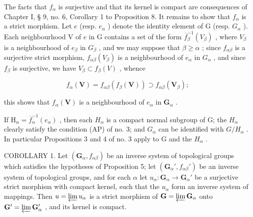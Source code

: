 The facts that \(f_{\alpha}\) is surjective and that its kernel is compact are consequences of Chapter I, § 9, no. 6, Corollary 1 to Proposition 8. It remains to show that \(f_{\alpha}\) is a strict morphism. Let \(e\) (resp. \(e_{\alpha}\) ) denote the identity element of G (resp. \(G_{\alpha}\) ). Each neighbourhood V of \(e\) in G contains a set of the form \(\overline{f}_{\beta}^{-1}(V_{\beta})\) , where \(V_{\beta}\) is a neighbourhood of \(e_{\beta}\) in \(G_{\beta}\) , and we may suppose that \(\beta \geqslant \alpha\) ; since \(f_{\alpha \beta}\) is a surjective strict morphism, \(f_{\alpha \beta}(V_{\beta})\) is a neighbourhood of \(e_{\alpha}\) in \(G_{\alpha}\) , and since \(f_{\beta}\) is surjective, we have \(V_{\beta} \subset f_{\beta}(V)\) , whence

\[
f _ {\alpha} (\mathbf {V}) = f _ {\alpha \beta} (f _ {\beta} (\mathbf {V})) \supset f _ {\alpha \beta} (\mathbf {V} _ {\beta});
\]

this shows that \(f_{\alpha}(\mathbf{V})\) is a neighbourhood of \(e_{\alpha}\) in \(\mathbf{G}_{\alpha}\) .

If \(\mathrm{H}_{\alpha}=\overline{f}_{\alpha}^{-1}(e_{\alpha})\) , then each \(H_{\alpha}\) is a compact normal subgroup of G; the \(H_{\alpha}\) clearly satisfy the condition (AP) of no. 3; and \(G_{\alpha}\) can be identified with \(G/H_{\alpha}\) . In particular Propositions 3 and 4 of no. 3 apply to G and the \(H_{\alpha}\) .

COROLLARY 1. Let \((\mathbf{G}_{\alpha}, f_{\alpha \beta})\) be an inverse system of topological groups which satisfies the hypotheses of Proposition 5; let \((\mathbf{G}_{\alpha}', f_{\alpha \beta}')\) be an inverse system of topological groups, and for each \(\alpha\) let \(u_{\alpha}: \mathbf{G}_{\alpha} \to \mathbf{G}_{\alpha}'\) be a surjective strict morphism with compact kernel, such that the \(u_{\alpha}\) form an inverse system of mappings. Then \(u = \varprojlim u_{\alpha}\) is a strict morphism of \(\mathbf{G} = \varprojlim \mathbf{G}_{\alpha}\) onto \(\mathbf{G}' = \varprojlim \mathbf{G}_{\alpha}'\) , and its kernel is compact.

